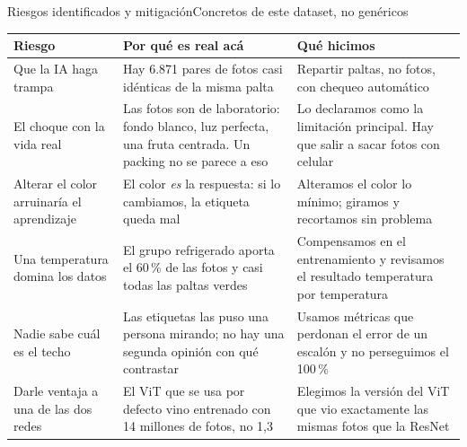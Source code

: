 \documentclass[aspectratio=169,11pt,table]{beamer}
\begin{document}
\begin{frame}{Riesgos identificados y mitigación}{Concretos de este dataset, no genéricos}
{\tiny
\centering
\begin{tabular}{>{\raggedright\arraybackslash}p{}>{\raggedright\arraybackslash}p{}>{\raggedright\arraybackslash}p{}}
\toprule
\rowcolor{verdeosc}\color{white}\bfseries Riesgo & \color{white}\bfseries Por qué es real acá & \color{white}\bfseries Qué hicimos \\
\midrule
Que la IA haga trampa & Hay 6.871 pares de fotos casi idénticas de la misma palta & Repartir paltas, no fotos, con chequeo automático \\
El choque con la vida real & Las fotos son de laboratorio: fondo blanco, luz perfecta, una fruta centrada. Un packing no se parece a eso & Lo declaramos como la limitación principal. Hay que salir a sacar fotos con celular \\
Alterar el color arruinaría el aprendizaje & El color \emph{es} la respuesta: si lo cambiamos, la etiqueta queda mal & Alteramos el color lo mínimo; giramos y recortamos sin problema \\
Una temperatura domina los datos & El grupo refrigerado aporta el 60\,\% de las fotos y casi todas las paltas verdes & Compensamos en el entrenamiento y revisamos el resultado temperatura por temperatura \\
Nadie sabe cuál es el techo & Las etiquetas las puso una persona mirando; no hay una segunda opinión con qué contrastar & Usamos métricas que perdonan el error de un escalón y no perseguimos el 100\,\% \\
Darle ventaja a una de las dos redes & El ViT que se usa por defecto vino entrenado con 14 millones de fotos, no 1,3 & Elegimos la versión del ViT que vio exactamente las mismas fotos que la ResNet \\
\bottomrule
\end{tabular}
}
\end{frame}
\end{document}
